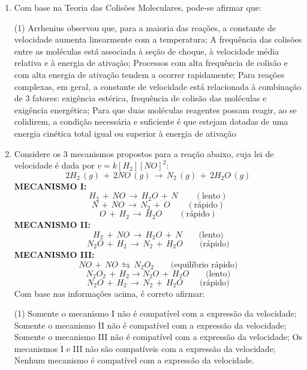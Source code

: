 \documentclass[12pt,a4paper]{article}
\begin{document}
\begin{enumerate}[label=(\roman*)]
\item Com base na Teoria das Colisões Moleculares, pode-se afirmar que:
\begin{tasks}(1)
\task Arrhenius observou que, para a maioria das reações, a constante de velocidade aumenta linearmente com a temperatura;
\task A frequência das colisões entre as moléculas está associada à seção de choque, à velocidade média relativa e à energia de ativação;
\task Processos com alta frequência de colisão e com alta energia de ativação tendem a ocorrer rapidamente;
\task Para reações complexas, em geral, a constante de velocidade está relacionada à combinação de 3 fatores: exigência estérica, frequência de colisão das moléculas e exigência energética;
\task Para que duas moléculas reagentes possam reagir, ao se colidirem, a condição necessária e suficiente é que estejam dotadas de uma energia cinética total igual ou superior à energia de ativação
\end{tasks}

\item Considere os 3 mecanismos propostos para a reação abaixo, cuja lei de velocidade é dada por $v = k[H_2][NO]^2$: $$2H_2\,(g)\, +\, 2NO \,(g)\, \to\, N_2\,(g)\, + \,2H_2O\,(g)$$\textbf{MECANISMO I:} $$H_2\, +\, NO\, \to\, H_2O\, + \,N\qquad (\text{lento})$$ $$N\,+\,NO\,\to \, N_2 \, + \, O\qquad (\text{rápido})$$ $$O\,+\,H_2\, \to\, H_2O\qquad (\text{rápido})$$\textbf{MECANISMO II:}$$H_2\,+\,NO\,\to\, H_2O\,+\,N\qquad \text{(lento)}$$ $$N_2O\,+\,H_2\,\to \, N_2\,+\, H_2O\qquad \text{(rápido)}$$\textbf{MECANISMO III:}$$NO\,+\,NO\, \leftrightarrows\, N_2O_2\qquad \text{(equilíbrio rápido)}$$ $$N_2O_2\, + \, H_2 \to N_2O\,+ \, H_2O\qquad \text{(lento)}$$ $$N_2O\, + \, H_2\, \to \, N_2 \, + \, H_2O\qquad \text{(rápido)} $$Com base nas informações acima, é correto afirmar:
\begin{tasks}(1)
\task Somente o mecanismo I não é compatível com a expressão da velocidade;
\task Somente o mecanismo II não é compatível com a expressão da velocidade;
\task Somente o mecanismo III não é compatível com a expressão da velocidade;
\task Os mecanismos I e III não são compatíveis com a expressão da velocidade;
\task Nenhum mecanismo é compatível com a expressão da velocidade.
\end{tasks}


\end{enumerate}
\end{document}
